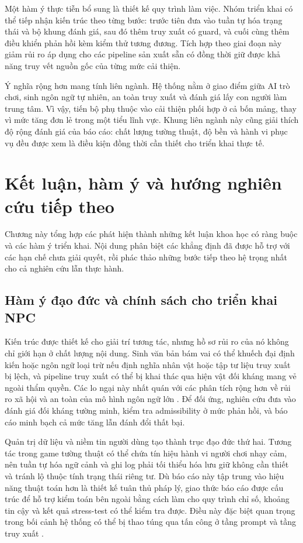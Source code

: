 ﻿\documentclass[a4paper,12pt]{article}
\begin{document}
Một hàm ý thực tiễn bổ sung là thiết kế quy trình làm việc. Nhóm triển khai có thể tiếp nhận kiến trúc theo từng bước: trước tiên đưa vào tuần tự hóa trạng thái và bộ khung đánh giá, sau đó thêm truy xuất có guard, và cuối cùng thêm điều khiển phản hồi kèm kiểm thử tương đương. Tích hợp theo giai đoạn này giảm rủi ro áp dụng cho các pipeline sản xuất sẵn có đồng thời giữ được khả năng truy vết nguồn gốc của từng mức cải thiện.

Ý nghĩa rộng hơn mang tính liên ngành. Hệ thống nằm ở giao điểm giữa AI trò chơi, sinh ngôn ngữ tự nhiên, an toàn truy xuất và đánh giá lấy con người làm trung tâm. Vì vậy, tiến bộ phụ thuộc vào cải thiện phối hợp ở cả bốn mảng, thay vì mức tăng đơn lẻ trong một tiểu lĩnh vực. Khung liên ngành này cũng giải thích độ rộng đánh giá của báo cáo: chất lượng tường thuật, độ bền và hành vi phục vụ đều được xem là điều kiện đồng thời cần thiết cho triển khai thực tế.

\section{Kết luận, hàm ý và hướng nghiên cứu tiếp theo}
Chương này tổng hợp các phát hiện thành những kết luận khoa học có ràng buộc và các hàm ý triển khai. Nội dung phân biệt các khẳng định đã được hỗ trợ với các hạn chế chưa giải quyết, rồi phác thảo những bước tiếp theo hệ trọng nhất cho cả nghiên cứu lẫn thực hành.

\subsection{Hàm ý đạo đức và chính sách cho triển khai NPC}
Kiến trúc được thiết kế cho giải trí tương tác, nhưng hồ sơ rủi ro của nó không chỉ giới hạn ở chất lượng nội dung. Sinh văn bản bám vai có thể khuếch đại định kiến hoặc ngôn ngữ loại trừ nếu định nghĩa nhân vật hoặc tập tư liệu truy xuất bị lệch, và pipeline truy xuất có thể bị khai thác qua hiện vật đối kháng mang vẻ ngoài thẩm quyền. Các lo ngại này nhất quán với các phân tích rộng hơn về rủi ro xã hội và an toàn của mô hình ngôn ngữ lớn \cite{Bender2021Parrots,Weidinger2022Taxonomy}. Để đối ứng, nghiên cứu đưa vào đánh giá đối kháng tường minh, kiểm tra admissibility ở mức phản hồi, và báo cáo minh bạch cả mức tăng lẫn đánh đổi thất bại.

Quản trị dữ liệu và niềm tin người dùng tạo thành trục đạo đức thứ hai. Tương tác trong game tường thuật có thể chứa tín hiệu hành vi người chơi nhạy cảm, nên tuần tự hóa ngữ cảnh và ghi log phải tối thiểu hóa lưu giữ không cần thiết và tránh lộ thuộc tính trạng thái riêng tư. Dù báo cáo này tập trung vào hiệu năng thuật toán hơn là thiết kế tuân thủ pháp lý, giao thức báo cáo được cấu trúc để hỗ trợ kiểm toán bên ngoài bằng cách làm cho quy trình chỉ số, khoảng tin cậy và kết quả stress-test có thể kiểm tra được. Điều này đặc biệt quan trọng trong bối cảnh hệ thống có thể bị thao túng qua tấn công ở tầng prompt và tầng truy xuất \cite{Zou2025PoisonedRAG,Chaturvedi2025AIP}.
\end{document}
